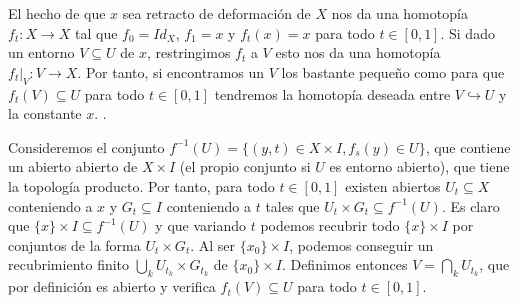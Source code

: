 \documentclass[twoside]{article}
\begin{document}
\begin{solucion}
El hecho de que $x$ sea retracto de deformación de $X$ nos da una homotopía $f_t:X\to X$ tal que $f_0=Id_X$, $f_1=x$ y $f_t(x)=x$ para todo $t\in[0,1]$. Si dado un entorno $V\subseteq U$ de $x$, restringimos $f_t$ a $V$ esto nos da una homotopía $f_t|_V: V\to X$. Por tanto, si encontramos un $V$ los bastante pequeño como para que $f_t(V)\subseteq U$ para todo $t\in [0,1]$ tendremos la homotopía deseada entre $V\hookrightarrow U$ y la constante $x$. . 

Consideremos el conjunto $f^{-1}(U)=\{(y,t)\in X\times I, f_s(y)\in U\}$, que contiene un abierto abierto de $X\times I$ (el propio conjunto si $U$ es entorno abierto), que tiene la topología producto. Por tanto, para todo $t\in [0,1]$ existen abiertos $U_t\subseteq X$ conteniendo a $x$ y $G_t\subseteq I$ conteniendo a $t$ tales que $U_t\times G_t\subseteq f^{-1}(U)$. Es claro que $\{x\}\times I\subseteq f^{-1}(U)$ y que variando $t$ podemos recubrir todo $\{x\}\times I$ por conjuntos de la forma $U_t\times G_t$. Al ser $\{x_0\}\times I$, podemos conseguir un recubrimiento finito $\bigcup_k U_{t_k}\times G_{t_k}$ de $\{x_0\}\times I$. Definimos entonces $V=\bigcap_k U_{t_k}$, que por definición es abierto y verifica $f_t(V)\subseteq U$ para todo $t\in [0,1]$. 


\end{solucion}
\end{document}
